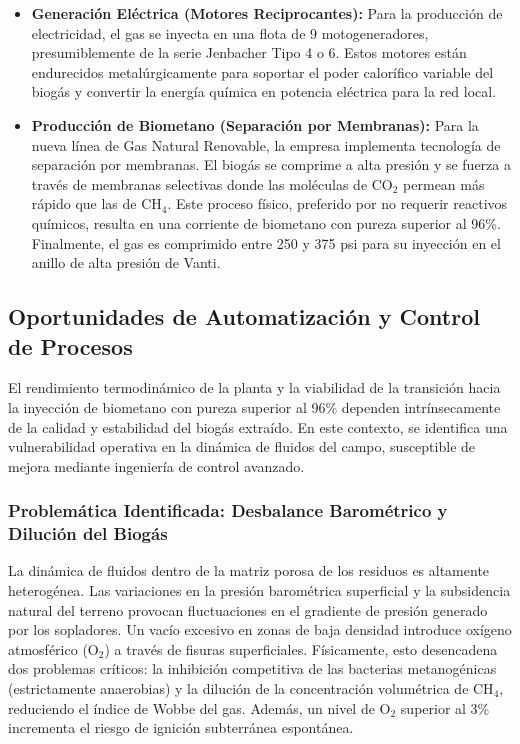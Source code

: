 \documentclass[11pt,letterpaper]{article}
\begin{document}
\begin{itemize}
  \item \textbf{Generación Eléctrica
  (Motores Reciprocantes):} Para la producción de electricidad, el gas se
  inyecta en una flota de 9 motogeneradores, presumiblemente de la serie
  Jenbacher Tipo 4 o 6. Estos motores están endurecidos metalúrgicamente para
  soportar el poder calorífico variable del biogás y convertir la energía
  química en potencia eléctrica para la red local.
  \item \textbf{Producción de Biometano (Separación por Membranas):} Para la
    nueva línea de Gas Natural Renovable, la empresa implementa tecnología de
    separación por membranas. El biogás se comprime a alta presión y se fuerza a
    través de membranas selectivas donde las moléculas de $\text{CO}_2$ permean
    más rápido que las de $\text{CH}_4$. Este proceso físico, preferido por no
    requerir reactivos químicos, resulta en una corriente de biometano con
    pureza superior al 96\%.  Finalmente, el gas es comprimido entre 250 y 375
    psi para su inyección en el anillo de alta presión de Vanti.
\end{itemize}

\subsection{Oportunidades de Automatización y Control de Procesos}

El rendimiento termodinámico de la planta y la viabilidad de la transición hacia
la inyección de biometano con pureza superior al 96\% dependen intrínsecamente
de la calidad y estabilidad del biogás extraído. En este contexto, se identifica
una vulnerabilidad operativa en la dinámica de fluidos del campo, susceptible de
mejora mediante ingeniería de control avanzado.

\subsubsection{Problemática Identificada: Desbalance Barométrico y Dilución del
Biogás}

La dinámica de fluidos dentro de la matriz porosa de los residuos es altamente
heterogénea. Las variaciones en la presión barométrica superficial y la
subsidencia natural del terreno provocan fluctuaciones en el gradiente de
presión generado por los sopladores. Un vacío excesivo en zonas de baja densidad
introduce oxígeno atmosférico ($\text{O}_{2}$) a través de fisuras
superficiales. Físicamente, esto desencadena dos problemas críticos: la
inhibición competitiva de las bacterias metanogénicas (estrictamente anaerobias)
y la dilución de la concentración volumétrica de $\text{CH}_{4}$, reduciendo el
índice de Wobbe del gas.  Además, un nivel de $\text{O}_{2}$ superior al 3\%
incrementa el riesgo de ignición subterránea espontánea.
\end{document}
